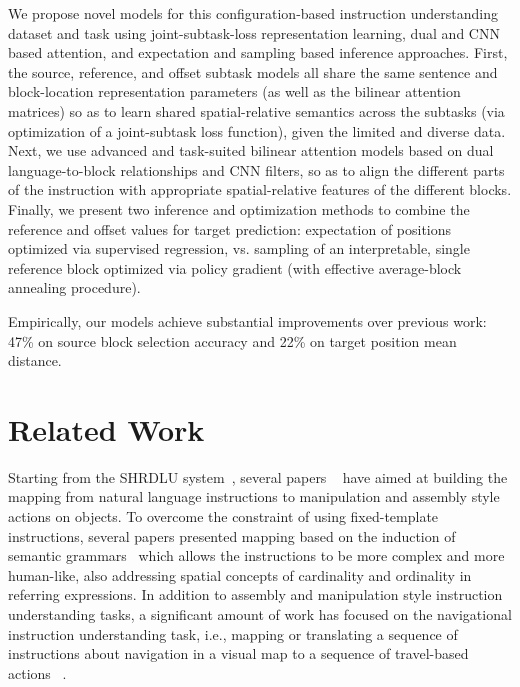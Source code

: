 \documentclass[letterpaper]{article} %
\begin{document}
We propose novel models for this configuration-based instruction understanding dataset and task using joint-subtask-loss representation learning, dual and CNN based attention, and expectation and sampling based inference approaches. 
First, the source, reference, and offset subtask models all share the same sentence and block-location representation parameters (as well as the bilinear attention matrices) so as to learn shared spatial-relative semantics across the subtasks (via optimization of a joint-subtask loss function), given the limited and diverse data. Next, we use advanced and task-suited bilinear attention models based on dual language-to-block relationships and CNN filters, so as to align the different parts of the instruction with appropriate spatial-relative features of the different blocks. Finally, we present two inference and optimization methods to combine the reference and offset values for target prediction: expectation of positions optimized via supervised regression, vs. sampling of an interpretable, single reference block optimized via policy gradient (with effective average-block annealing procedure). 

Empirically, our models achieve substantial improvements over previous work: 47\% on source block selection accuracy and 22\% on target position mean distance.

\section{Related Work}


Starting from the SHRDLU system~\cite{winograd72}, several papers ~\cite{branavan2009reinforcement,howard2014natural,matuszek2014learning} have aimed at building the mapping from natural language instructions to manipulation and assembly style actions on objects. 
To overcome the constraint of using fixed-template instructions, several papers presented mapping based on the induction of semantic grammars~\cite{zettlemoyer2005learning,tellex2011understanding,matuszek2012joint,misra2015environment,paul2016efficient} which allows the instructions to be more complex and more human-like, also addressing spatial concepts of cardinality and ordinality in referring expressions. 
%
In addition to assembly and manipulation style instruction understanding tasks, a significant amount of work has focused on the navigational instruction understanding task, i.e., mapping or translating a sequence of instructions about navigation in a visual map to a sequence of travel-based actions~\cite{chen2011learning,artzi2013weakly,mei2015listen,andreas2015alignment} . 
 
\end{document}
